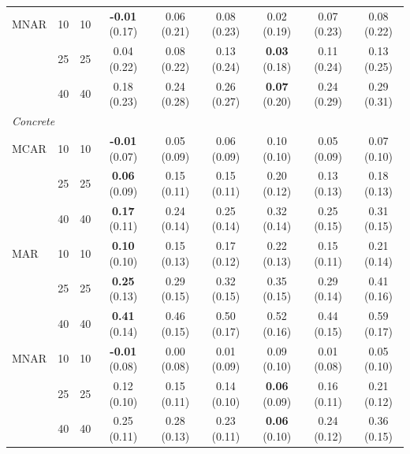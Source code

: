 \begin{tabular}{llrcccccc}
MNAR & 10 & 10 & \textbf{-0.01} (0.17) & 0.06 (0.21) & 0.08 (0.23) & 0.02 (0.19) & 0.07 (0.23) & 0.08 (0.22)\\
 & 25 & 25 & 0.04 (0.22) & 0.08 (0.22) & 0.13 (0.24) & \textbf{0.03} (0.18) & 0.11 (0.24) & 0.13 (0.25)\\
 & 40 & 40 & 0.18 (0.23) & 0.24 (0.28) & 0.26 (0.27) & \textbf{0.07} (0.20) & 0.24 (0.29) & 0.29 (0.31)\\
\midrule
\multicolumn{9}{l}{\textit{Concrete}}\\
MCAR & 10 & 10 & \textbf{-0.01} (0.07) & 0.05 (0.09) & 0.06 (0.09) & 0.10 (0.10) & 0.05 (0.09) & 0.07 (0.10)\\
 & 25 & 25 & \textbf{0.06} (0.09) & 0.15 (0.11) & 0.15 (0.11) & 0.20 (0.12) & 0.13 (0.13) & 0.18 (0.13)\\
 & 40 & 40 & \textbf{0.17} (0.11) & 0.24 (0.14) & 0.25 (0.14) & 0.32 (0.14) & 0.25 (0.15) & 0.31 (0.15)\\
MAR & 10 & 10 & \textbf{0.10} (0.10) & 0.15 (0.13) & 0.17 (0.12) & 0.22 (0.13) & 0.15 (0.11) & 0.21 (0.14)\\
 & 25 & 25 & \textbf{0.25} (0.13) & 0.29 (0.15) & 0.32 (0.15) & 0.35 (0.15) & 0.29 (0.14) & 0.41 (0.16)\\
 & 40 & 40 & \textbf{0.41} (0.14) & 0.46 (0.15) & 0.50 (0.17) & 0.52 (0.16) & 0.44 (0.15) & 0.59 (0.17)\\
MNAR & 10 & 10 & \textbf{-0.01} (0.08) & 0.00 (0.08) & 0.01 (0.09) & 0.09 (0.10) & 0.01 (0.08) & 0.05 (0.10)\\
 & 25 & 25 & 0.12 (0.10) & 0.15 (0.11) & 0.14 (0.10) & \textbf{0.06} (0.09) & 0.16 (0.11) & 0.21 (0.12)\\
 & 40 & 40 & 0.25 (0.11) & 0.28 (0.13) & 0.23 (0.11) & \textbf{0.06} (0.10) & 0.24 (0.12) & 0.36 (0.15)\\
\bottomrule
\end{tabular}
